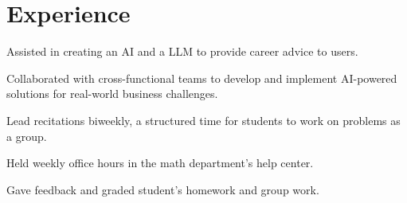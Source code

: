 \documentclass[letterpaper]{deedy-resume} %
\begin{document}
\begin{minipage}[t]{0.66\textwidth} %


\section{Experience}


        \vspace{\topsep} %
        \begin{tightitemize}
            \item Assisted in creating an AI and a LLM to provide career advice to users.
            \item Collaborated with cross-functional teams to develop and implement AI-powered solutions for real-world business challenges.
        \end{tightitemize}

        \sectionspace %



        \vspace{\topsep} %
        \begin{tightitemize}
            \item Lead recitations biweekly, a structured time for students to work on problems as a group.
            \item Held weekly office hours in the math department's help center.
            \item Gave feedback and graded student's homework and group work.
        \end{tightitemize}

        \sectionspace %




\end{minipage}
\end{document}
